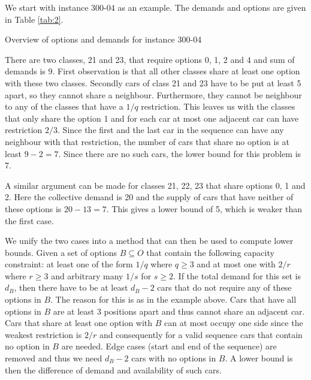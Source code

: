 \documentclass[]{llncs}
\begin{document}
We start with instance 300-04 as an example. The demands and options are given in Table \ref{tab:2}. 

\begin{table}[htbp]
    \caption{Overview of options and demands for instance 300-04}
    \centering
    
    \label{tab:2}
\end{table}

There are two classes, 21 and 23, that require options 0, 1, 2 and 4 and sum of demands is 9. First observation is that
all other classes share at least one option with these two classes.  Secondly cars of class 21 and 23 have to be put at
least 5 apart, so they cannot share a neighbour. Furthermore, they cannot be neighbour to any of the classes that have a
$1/q$ restriction. This leaves us with the classes that only share the option 1 and for each car at most one adjacent
car can have restriction $2/3$. Since the first and the last car in the sequence can have any neighbour with that
restriction, the number of cars that share no option is at least $9-2=7$. Since there are no such cars, the lower bound
for this problem is 7. 

A similar argument can be made for classes 21, 22, 23 that share options 0, 1 and 2. Here the collective demand is 20
and the supply of cars that have neither of these options is $20 - 13 = 7$. This gives a lower bound of 5, which is
weaker than the first case. 

We unify the two cases into a method that can then be used to compute lower bounds. Given a set of options $B\subseteq
O$ that contain the following capacity constraint: at least one of the form $1/q$ where $q \geq 3$ and at most one with
$2/r$ where $r \geq 3$ and arbitrary many $1/s$ for $s \geq 2$. If the total demand for this set is $d_B$, then there
have to be at least $d_B-2$ cars that do not require any of these options in $B$. The reason for this is as in the
example above. Cars that have all options in $B$ are at least 3 positions apart and thus cannot share an adjacent car.
Cars that share at least one option with $B$ can at most occupy one side since the weakest restriction is $2/r$ and
consequently for a valid sequence cars that contain no option in $B$ are needed. Edge cases (start and end of the
sequence) are removed and thus we need $d_B-2$ cars with no options in $B$. A lower bound is then the difference of
demand and availability of such cars. 
\end{document}
